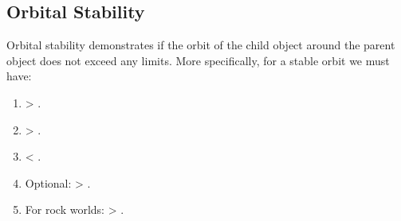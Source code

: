 \documentclass[letterpaper,10pt,english]{sphinxmanual}
\begin{document}
\subsection{Orbital Stability}
\label{\detokenize{quantities/orbital/orbital_stability:orbital-stability}}\label{\detokenize{quantities/orbital/orbital_stability::doc}}\label{\detokenize{quantities/orbital/orbital_stability:id1}}
\sphinxAtStartPar
Orbital stability demonstrates if the orbit of the child object around the parent object
does not exceed any limits. More specifically, for a stable orbit we must have:
\begin{enumerate}
%
\item {} 
\sphinxAtStartPar
{\hyperref[\detokenize{quantities/orbital/periapsis:id1}]{}} \textgreater{} {\hyperref[\detokenize{quantities/children_orbit_limits/roche_limit:id1}]{}}.

\item {} 
\sphinxAtStartPar
{\hyperref[\detokenize{quantities/orbital/semi_major_axis:id1}]{}} \textgreater{} {\hyperref[\detokenize{quantities/children_orbit_limits/p_type_critical_orbit:p-type-critical-orbit}]{}}.

\item {} 
\sphinxAtStartPar
{\hyperref[\detokenize{quantities/orbital/apoapsis:id1}]{}} \textless{} {\hyperref[\detokenize{quantities/orbital/semi_major_axis_maximum_limit:id1}]{}}.

\item {} 
\sphinxAtStartPar
Optional: {\hyperref[\detokenize{quantities/orbital/semi_major_axis:id1}]{}} \textgreater{} {\hyperref[\detokenize{quantities/children_orbit_limits/inner_orbit_limit:id1}]{}}.

\item {} 
\sphinxAtStartPar
For rock worlds: {\hyperref[\detokenize{quantities/orbital/semi_major_axis:id1}]{}} \textgreater{} {\hyperref[\detokenize{quantities/children_orbit_limits/outer_rock_formation_limit:id1}]{}}.

\end{enumerate}
\end{document}
